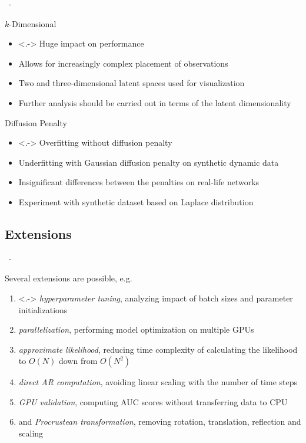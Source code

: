 \documentclass{beamer}
\newenvironment{xframe}
    {\begin{frame}{
        \ifx\insertsubsection\empty
            \strut
        \else\ifx\insertsubsubsection\empty
            \insertsection
        \else
            \insertsection~-~\insertsubsection
        \fi\fi
    }{
        \ifx\insertsubsection\empty
            \insertsection
        \else\ifx\insertsubsubsection\empty
            \insertsubsection
        \else
            \insertsubsubsection
        \fi\fi
    }}
    {\end{frame}}
\newenvironment{xblock}[1]
    {\begin{block}{#1}}
    {\end{block}}
\begin{document}
    \begin{xframe}
        \begin{xblock}{$k$-Dimensional}
            \begin{itemize}
                \item<.-> Huge impact on performance
                \item Allows for increasingly complex placement of observations
                \item Two and three-dimensional latent spaces used for visualization
                \item Further analysis should be carried out in terms of the latent dimensionality
            \end{itemize}
        \end{xblock}
        
        \begin{xblock}{Diffusion Penalty}
            \begin{itemize}
                \item<.-> Overfitting without diffusion penalty
                \item Underfitting with Gaussian diffusion penalty on synthetic dynamic data
                \item Insignificant differences between the penalties on real-life networks
                \item Experiment with synthetic dataset based on Laplace distribution
            \end{itemize}
        \end{xblock}
    \end{xframe}
    
    \subsection{Extensions}
    
    \begin{xframe}
    
        \begin{xblock}{Several extensions are possible, e.g.}
            \begin{enumerate}
                \item<.-> \emph{hyperparameter tuning}, analyzing impact of batch sizes and parameter initializations
                \item \emph{parallelization}, performing model optimization on multiple GPUs
                \item \emph{approximate likelihood}, reducing time complexity of calculating the likelihood to $O(N)$ down from $O(N^2)$
                \item \emph{direct AR computation}, avoiding linear scaling with the number of time steps
                \item \emph{GPU validation}, computing AUC scores without transferring data to CPU
                \item and \emph{Procrustean transformation}, removing rotation, translation, reflection and scaling
            \end{enumerate}
        \end{xblock}
    \end{xframe}
    
\end{document}
